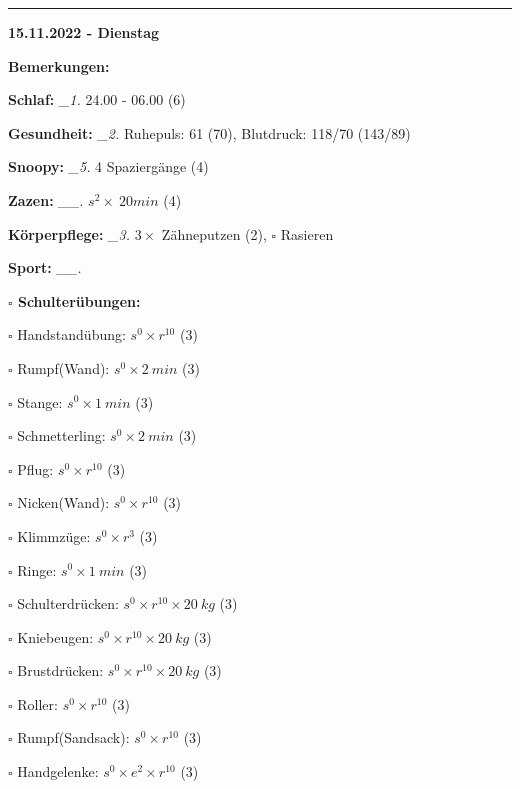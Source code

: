 \documentclass[10pt,a4paper]{article}
\newcommand\prop[1] {{\color {alizarin} {\bf #1}}}             %
\newcommand\rele[1] {{\color {english} \bf {#1}}}              %
\newcommand\mand[1] {{\color {burntorange} {\bf #1}}}          %
\newcommand\ddivide {\vskip -9pt \hrule \vskip 6pt}
\newcommand\topspace{\vskip -15pt \hskip 20pt}
\newcommand\n[1] { {\sl #1.} \hskip 5pt }
\begin{document}
\ddivide
{\rele {15.11.2022 - Dienstag}}

\begin{mdframed}[style=daystyle]
  \begin{labeling}{{\mand {Bemerkungen:}}}
    \setlength\itemsep{-3pt}
  \item[{\mand {Schlaf:}}]        \n{\_1} 24.00 - 06.00 (6)
  \item[{\mand {Gesundheit:}}]    \n{\_2} Ruhepuls: 61 (70), Blutdruck: 118/70 (143/89)
  \item[{\mand {Snoopy:}}]        \n{\_5} 4 Spaziergänge (4) 
  \item[{\mand {Zazen:}}]        \n{\_\_} $s^2 \times\ 20 min$ (4)
  \item[{\mand {Körperpflege:}}]  \n{\_3} $3 \times$ Zähneputzen (2), $\square$ Rasieren
  \item[{\mand {Sport:}}]        \n{\_\_}
    \topspace
    \begin{minipage}{0.75\textwidth}  
      \begin{labeling}{\prop {$\square$ {Schulterübungen:}}} 
        \setlength\itemsep{-3pt}
      \item[$\square$ Handstandübung:]  $s^0 \times r^{10}$ (3)
      \item[$\square$ Rumpf(Wand):]     $s^0 \times 2\ min$ (3)
      \item[$\square$ Stange:]          $s^0 \times 1\ min$ (3)
      \item[$\square$ Schmetterling:]   $s^0 \times 2\ min$ (3)
      \item[$\square$ Pflug:]           $s^0 \times r^{10}$ (3)
      \item[$\square$ Nicken(Wand):]    $s^0 \times r^{10}$ (3)
      \item[$\square$ Klimmzüge:]       $s^0 \times r^3$ (3)
      \item[$\square$ Ringe:]           $s^0 \times 1\ min$ (3)
      \item[$\square$ Schulterdrücken:] $s^0 \times r^{10} \times 20\ kg$ (3)
      \item[$\square$ Kniebeugen:]      $s^0 \times r^{10} \times 20\ kg$ (3)
      \item[$\square$ Brustdrücken:]    $s^0 \times r^{10} \times 20\ kg$ (3)
      \item[$\square$ Roller:]          $s^0 \times r^{10}$ (3)
      \item[$\square$ Rumpf(Sandsack):] $s^0 \times r^{10}$ (3)
      \item[$\square$ Handgelenke:]     $s^0 \times e^2 \times r^{10}$ (3)

\end{labeling}
\end{minipage}
\end{labeling}
\end{mdframed}
\end{document}
